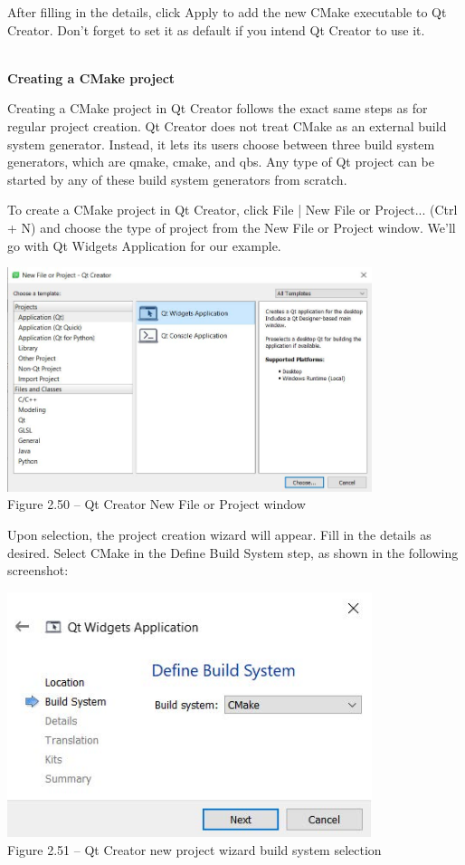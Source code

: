 After filling in the details, click Apply to add the new CMake executable to Qt Creator. Don't forget to set it as default if you intend Qt Creator to use it.

\hspace*{\fill} \\ %
\noindent
\textbf{Creating a CMake project}

Creating a CMake project in Qt Creator follows the exact same steps as for regular project creation. Qt Creator does not treat CMake as an external build system generator. Instead, it lets its users choose between three build system generators, which are qmake, cmake, and qbs. Any type of Qt project can be started by any of these build system generators from scratch.

To create a CMake project in Qt Creator, click File | New File or Project... (Ctrl + N) and choose the type of project from the New File or Project window. We'll go with Qt Widgets Application for our example.

\begin{center}
\includegraphics[width=0.8\textwidth]{content/1/chapter2/images/50.jpg}\\
Figure 2.50 – Qt Creator New File or Project window
\end{center}

Upon selection, the project creation wizard will appear. Fill in the details as desired. Select CMake in the Define Build System step, as shown in the following screenshot:

\begin{center}
\includegraphics[width=0.8\textwidth]{content/1/chapter2/images/51.jpg}\\
Figure 2.51 – Qt Creator new project wizard build system selection
\end{center}

